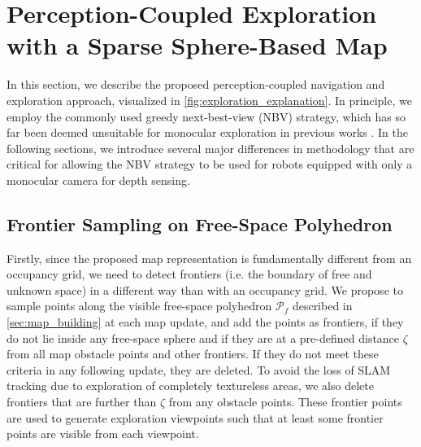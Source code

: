 \documentclass[letterpaper, 10 pt, journal, twoside]{IEEEtran}
\begin{document}
{\section{Perception-Coupled Exploration with a Sparse Sphere-Based Map}
{In this section, we describe the proposed perception-coupled navigation and exploration approach, visualized in \autoref{fig:exploration_explanation}.}
In principle, we employ the commonly used greedy next-best-view (NBV) \cite{paper_frontier_grandpa} strategy, which has so far been deemed unsuitable for monocular exploration in previous works \cite{from_monoslam_to_explo, los_maps}.
In the following sections, we introduce several major differences in methodology that are critical for allowing the NBV strategy to be used for robots equipped with only a monocular camera for depth sensing.

\subsection{Frontier Sampling on Free-Space Polyhedron}
Firstly, since the proposed map representation is fundamentally different from an occupancy grid, we need to detect frontiers (i.e. the boundary of free and unknown space) in a different way than with an occupancy grid.
{We propose to sample points along the visible free-space polyhedron $ \mathcal{P}_f $  described in \autoref{sec:map_building} at each map update, and add the points as frontiers, if they do not lie inside any free-space sphere and if they are at a pre-defined distance $\zeta$ from all map obstacle points and other frontiers.
If they do not meet these criteria in any following update, they are deleted. 
To avoid the loss of SLAM tracking due to exploration of completely textureless areas, we also delete frontiers that are further than $\zeta$ from any obstacle points.}
These frontier points are used to generate exploration viewpoints such that at least some frontier points are visible from each viewpoint.

\begin{figure}[!htb]
 \def\subfigwidth{0.48\linewidth}
  \centering


\end{figure}}
\end{document}
